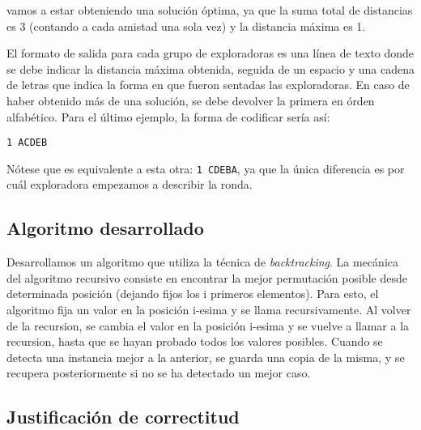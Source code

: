 vamos a estar obteniendo una solución óptima, ya que la suma total de distancias es 3 (contando a cada amistad una sola vez) y la distancia máxima es 1.

El formato de salida para cada grupo de exploradoras es una línea de texto donde se debe indicar la distancia máxima obtenida, seguida de un espacio y una cadena de letras que indica la forma en que fueron sentadas las exploradoras. En caso de haber obtenido más de una solución, se debe devolver la primera en órden alfabético. Para el último ejemplo, la forma de codificar sería así:

\texttt{1 ACDEB}

Nótese que es equivalente a esta otra: \texttt{1 CDEBA}, ya que la única diferencia es por cuál exploradora empezamos a describir la ronda.



\subsection{Algoritmo desarrollado}

Desarrollamos un algoritmo que utiliza la técnica de \textit{backtracking}. 
La mecánica del algoritmo recursivo consiste en encontrar la mejor permutación posible desde determinada posición (dejando fijos los i primeros elementos).
Para esto, el algoritmo fija un valor en la posición i-esima y se llama recursivamente. Al volver de la recursion, se cambia el valor en la posición i-esima y se vuelve a llamar a la recursion, hasta que se hayan probado todos los valores posibles.
Cuando se detecta una instancia mejor a la anterior, se guarda una copia de la misma, y se recupera posteriormente si no se ha detectado un mejor caso.

\subsection{Justificación de correctitud}

